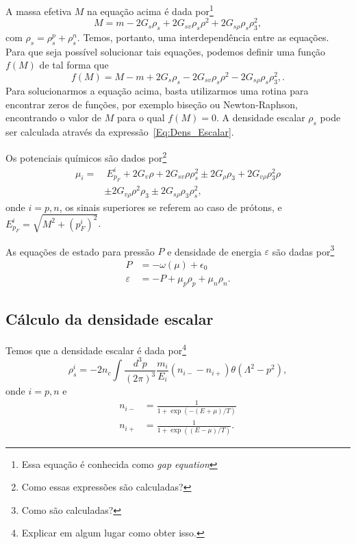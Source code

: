 A massa efetiva $M$ na equação acima é dada por\footnote{Essa equação é conhecida como \emph{gap equation}}
\begin{equation}\label{Eq:Gap}
	M = m - 2G_s\rho_s + 2G_{sv}\rho_s\rho^2 + 2 G_{s\rho}\rho_s\rho_3^2,
\end{equation}
%
com $\rho_s = \rho_s^p + \rho_s^n$. Temos, portanto, uma interdependência entre as equações. Para que seja possível solucionar tais equações, podemos definir uma função $f(M)$ de tal forma que
\begin{equation}\label{Eq:Gap_zero}
	f(M) = M - m + 2G_s\rho_s - 2G_{sv}\rho_s\rho^2 - 2 G_{s\rho}\rho_s\rho_3^2,.
\end{equation}
%
Para solucionarmos a equação acima, basta utilizarmos uma rotina para encontrar zeros de funções, por exemplo biseção ou Newton-Raphson, encontrando o valor de $M$ para o qual $f(M) = 0$. A densidade escalar $\rho_s$ pode ser calculada através da expressão~\eqref{Eq:Dens_Escalar}.

Os potenciais químicos são dados por\footnote{Como essas expressões são calculadas?}
\begin{equation}\label{Eq:Potenciais_Quimicos}
\begin{split}
	\mu_i =&~ E_{p_F}^i + 2G_v\rho + 2G_{sv}\rho\rho_s^2 \pm 2G_\rho\rho_3+2G_{v\rho}\rho_3^2\rho \\
	& \pm 2G_{v\rho}\rho^2\rho_3 \pm 2 G_{s\rho}\rho_3\rho_s^2,
\end{split}
\end{equation}
%
onde $i = p,n$, os sinais superiores se referem ao caso de prótons, e $E_{p_F}^i = \sqrt{M^2 + (p_F^i)^2}$.

As equações de estado para pressão $P$ e densidade de energia $\varepsilon$ são dadas por\footnote{Como são calculadas?}
\begin{align}
	P &= -\omega(\mu) + \epsilon_0 \label{Eq:Pressao}\\
	\varepsilon &= -P + \mu_p\rho_p + \mu_n\rho_n. \label{Eq:Densidade_energia}
\end{align}

\subsection{Cálculo da densidade escalar}

Temos que a densidade escalar é dada por\footnote{Explicar em algum lugar como obter isso.}
\begin{equation}
	\rho_s^i = - 2 n_c \int \frac{d^3p}{(2\pi)^3}\frac{m_i}{E_i}(n_{i-} - n_{i+}) \theta(\Lambda^2 - p^2),
\end{equation}
%
onde $i = p, n$ e
\begin{align}
	n_{i-} &= \frac{1}{1 + \exp(-(E+\mu)/T)} \\
	n_{i+} &= \frac{1}{1 + \exp((E-\mu)/T)}.
\end{align}

